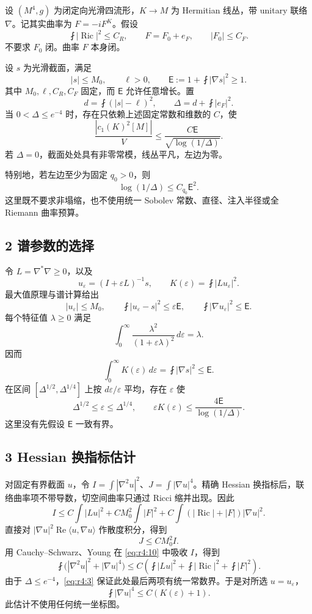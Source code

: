 \documentclass[UTF8,11pt,openany,oneside,fontset=none]{ctexbook}
\begin{document}
设 \((M^4,g)\) 为闭定向光滑四流形，\(K\to M\) 为 Hermitian 线丛，带 unitary 联络 \(\nabla\)。记其实曲率为 \(F=-iF^K\)。假设 \[
\fint|\operatorname{Ric}|^2\le C_R,
\qquad F=F_0+e_F,
\qquad |F_0|\le C_F.
\tag{4.3}\label{eq:r4:3}
\] 不要求 \(F_0\) 闭。曲率 \(F\) 本身闭。

设 \(s\) 为光滑截面，满足 \[
|s|\le M_0,\qquad \ell>0,
\qquad \mathsf E:=1+\fint|\nabla s|^2\ge1.
\] 其中 \(M_0,\ell,C_R,C_F\) 固定，而 \(\mathsf E\) 允许任意增长。置 \[
d=\fint(|s|-\ell)^2,
\qquad \Delta=d+\fint|e_F|^2.
\tag{4.4}\label{eq:r4:4}
\] 当 \(0<\Delta\le e^{-4}\) 时，存在只依赖上述固定常数和维数的 \(C\)，使 \[
\boxed{
\frac{|c_1(K)^2[M]|}{V}
\le \frac{C\mathsf E}{\sqrt{\log(1/\Delta)}}.
}
\tag{4.5}\label{eq:r4:5}
\] 若 \(\Delta=0\)，截面处处具有非零常模，线丛平凡，左边为零。

特别地，若左边至少为固定 \(q_0>0\)，则 \[
\boxed{
\log(1/\Delta)\le C_{q_0}\mathsf E^2.
}
\tag{4.6}\label{eq:r4:6}
\] 这里既不要求非塌缩，也不使用统一 Sobolev 常数、直径、注入半径或全 Riemann 曲率预算。

\subsection{2 谱参数的选择}\label{ch4:ux8c31ux53c2ux6570ux7684ux9009ux62e9}

令 \(L=\nabla^*\nabla\ge0\)，以及 \[
u_\varepsilon=(I+\varepsilon L)^{-1}s,
\qquad K(\varepsilon)=\fint|Lu_\varepsilon|^2.
\] 最大值原理与谱计算给出 \[
|u_\varepsilon|\le M_0,
\qquad \fint|u_\varepsilon-s|^2\le\varepsilon\mathsf E,
\qquad \fint|\nabla u_\varepsilon|^2\le\mathsf E.
\tag{4.7}\label{eq:r4:7}
\] 每个特征值 \(\lambda\ge0\) 满足 \[
\int_0^\infty\frac{\lambda^2}{(1+\varepsilon\lambda)^2}\,d\varepsilon=\lambda.
\] 因而 \[
\int_0^\infty K(\varepsilon)\,d\varepsilon
=\fint|\nabla s|^2\le\mathsf E.
\tag{4.8}\label{eq:r4:8}
\] 在区间 \([\Delta^{1/2},\Delta^{1/4}]\) 上按 \(d\varepsilon/\varepsilon\) 平均，存在 \(\varepsilon\) 使 \[
\Delta^{1/2}\le\varepsilon\le\Delta^{1/4},
\qquad
\varepsilon K(\varepsilon)\le
\frac{4\mathsf E}{\log(1/\Delta)}.
\tag{4.9}\label{eq:r4:9}
\] 这里没有先假设 \(\mathsf E\) 一致有界。

\subsection{3 Hessian 换指标估计}\label{ch4:hessian-ux6362ux6307ux6807ux4f30ux8ba1}

对固定有界截面 \(u\)，令 \(I=\int|\nabla^2u|^2\)、\(J=\int|\nabla u|^4\)。精确 Hessian 换指标后，联络曲率项不带导数，切空间曲率只通过 Ricci 缩并出现。因此 \[
I\le C\int|Lu|^2+C M_0^2\int|F|^2
+C\int(|\operatorname{Ric}|+|F|)|\nabla u|^2.
\tag{4.10}\label{eq:r4:10}
\] 直接对 \(|\nabla u|^2\operatorname{Re}\langle u,\nabla u\rangle\) 作散度积分，得到 \[
J\le C M_0^2 I.
\tag{4.11}\label{eq:r4:11}
\] 用 Cauchy--Schwarz、Young 在 \eqref{eq:r4:10} 中吸收 \(I\)，得到 \[
\fint\bigl(|\nabla^2u|^2+|\nabla u|^4\bigr)
\le C\left(\fint|Lu|^2+\fint|\operatorname{Ric}|^2+\fint|F|^2\right).
\tag{4.12}\label{eq:r4:12}
\] 由于 \(\Delta\le e^{-4}\)，\eqref{eq:r4:3} 保证此处最后两项有统一常数界。于是对所选 \(u=u_\varepsilon\)， \[
\fint|\nabla u|^4\le C(K(\varepsilon)+1).
\tag{4.13}\label{eq:r4:13}
\] 此估计不使用任何统一坐标图。
\end{document}
